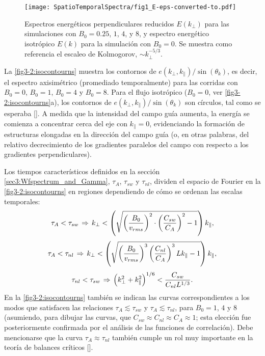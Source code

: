 \begin{figure}
  \centering
  \texttt{[image: SpatioTemporalSpectra/fig1\_E-eps-converted-to.pdf]}
  \caption{Espectros energéticos perpendiculares reducidos $E(k_\perp)$ para las
  simulaciones con $B_0=0.25$, $1$, $4$, y $8$, y espectro energético
  isotrópico $E(k)$ para la simulación con $B_0=0$. Se muestra como
  referencia el escaleo de Kolmogorov, $\sim k_\perp^{-5/3}$.}
  \label{fig3-1:E}
\end{figure}


La \cref{fig3-2:isocontourns} muestra los contornos de
$e(k_\perp,k_\parallel)/\sin(\theta_k)$, es decir, el espectro
axisimétrico (promediado temporalmente) para las corridas con $B_0=0$,
$B_0=1$, $B_0=4$ y $B_0=8$. Para el flujo isotrópico ($B_0=0$, ver
\cref{fig3-2:isocontourns}a), los contornos de
$e(k_\perp,k_\parallel)/\sin(\theta_k)$ son círculos, tal como se
esperaba [\cite{mininni_isotropization_2012}]. A medida que la
intensidad del campo guía aumenta, la energía se comienza a concentrar
cerca del eje con $k_\parallel=0$, evidenciando la formación de
estructuras elongadas en la dirección del campo guía (o, en otras
palabras, del relativo decrecimiento de los gradientes paralelos del
campo con respecto a los gradientes perpendiculares).

Los tiempos característicos definidos en la
sección \ref{sec3:Wfspectrum_and_Gamma}, $\tau_A$, $\tau_{sw}$ y
$\tau_{nl}$, dividen el espacio de Fourier en
la \cref{fig3-2:isocontourns} en regiones dependiendo de cómo se
ordenan las escalas temporales:
\begin{equation}\label{eq3:Asw} \tau_A < \tau_{sw} \hspace{0.05cm}
\Rightarrow \hspace{0.05cm} k_\perp <
\left(\sqrt{\left(\frac{B_0}{v_{rms}}\right)^2 \cdot
\left(\frac{C_{sw}}{C_A}\right)^2 - 1} \right) k_\parallel,
\end{equation}
\begin{equation}\label{eq3:Anl} \tau_A < \tau_{nl} \hspace{0.05cm}
\Rightarrow \hspace{0.05cm} k_\perp <
\left(\sqrt{\left(\frac{B_0}{v_{rms}}\right)^3
\left(\frac{C_{nl}}{C_A}\right)^3 Lk_\parallel - 1} \right) 
k_\parallel,
\end{equation}
\begin{equation}\label{eq3:nlsw} \tau_{nl} < \tau_{sw} \hspace{0.05cm}
\Rightarrow \hspace{0.05cm} \left( k_\perp^2 + k_\parallel^2
\right)^{1/6} < \frac{C_{sw}}{C_{nl}L^{1/3}}.
\end{equation}
En la \cref{fig3-2:isocontourns} también se indican las curvas
correspondientes a los modos que satisfacen las relaciones
$\tau_A\lesssim\tau_{sw}$ y $\tau_A\lesssim\tau_{nl}$, para $B_0=1$,
$4$ y $8$ (asumiendo, para dibujar las curvas, que $C_{sw} \approx
C_{nl} \approx C_A \approx 1$; esta elección fue posteriormente
confirmada por el análisis de las funciones de correlación). Debe
mencionarse que la curva $\tau_A\approx\tau_{nl}$ también cumple un
rol muy importante en la teoría de balances críticos
[\cite{sridhar_toward_1994}].

